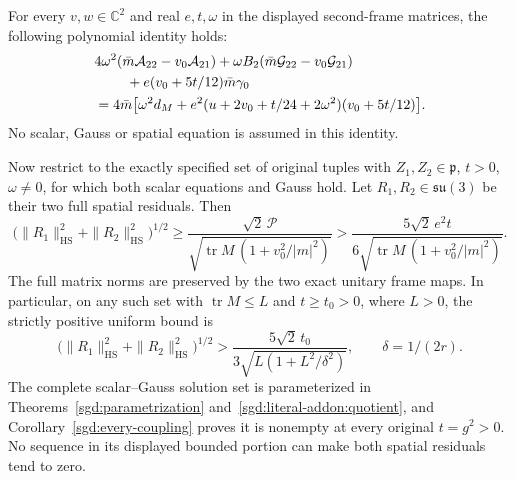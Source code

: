 \begin{proposition}
\label{q444:twocross:quantitative}
For every $v,w\in\mathbb C^2$ and real $e,t,\omega$ in the displayed
second-frame matrices, the following polynomial identity holds:
\begin{align}
 &4\omega^2(\bar m\mathcal A_{22}-v_0\mathcal A_{21})
   +\omega B_2(\bar m\mathcal G_{22}-v_0\mathcal G_{21})\notag\\
 &\hspace{8mm}+e(v_0+5t/12)\bar m\gamma_0\notag\\
 &=4\bar m\bigl[\omega^2d_M+
      e^2(u+2v_0+t/24+2\omega^2)(v_0+5t/12)\bigr].
 \label{q444:twocross:polynomial-certificate}
\end{align}
No scalar, Gauss or spatial equation is assumed in this identity.

Now restrict to the exactly specified set of original tuples with
$Z_1,Z_2\in\mathfrak p$, $t>0$, $\omega\ne0$, for which both
scalar equations and Gauss hold. Let $R_1,R_2\in\mathfrak{su}(3)$
be their two full spatial residuals. Then
\begin{equation}
 \bigl(\|R_1\|_{\mathrm{HS}}^2+
             \|R_2\|_{\mathrm{HS}}^2\bigr)^{1/2}
 \geq
 \frac{\sqrt2\,\mathcal P}
 {\sqrt{\operatorname{tr}M\,(1+v_0^2/|m|^2)}}
 >\frac{5\sqrt2\,e^2t}
 {6\sqrt{\operatorname{tr}M\,(1+v_0^2/|m|^2)}}.
 \label{q444:twocross:residual-lower-bound}
\end{equation}
The full matrix norms are preserved by the two exact unitary frame maps.
In particular, on any such set with $\operatorname{tr}M\leq L$ and
$t\geq t_0>0$, where $L>0$, the strictly positive uniform bound is
\begin{equation}
 \bigl(\|R_1\|_{\mathrm{HS}}^2+
             \|R_2\|_{\mathrm{HS}}^2\bigr)^{1/2}
 >\frac{5\sqrt2\,t_0}
 {3\sqrt{L(1+L^2/\delta^2)}},\qquad \delta=1/(2r).
 \label{q444:twocross:uniform-bound}
\end{equation}
The complete scalar--Gauss solution set is parameterized in
Theorems~\ref{sgd:parametrization} and~\ref{sgd:literal-addon:quotient},
and Corollary~\ref{sgd:every-coupling} proves it is nonempty at every
original $t=g^2>0$. No sequence in its displayed bounded portion can
make both spatial residuals tend to zero.
\end{proposition}

